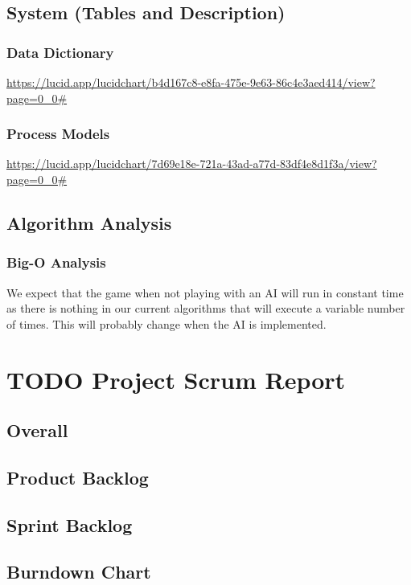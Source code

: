 \documentclass[11pt]{article}
\begin{document}
\subsection{System (Tables and Description)}
\label{sec:org2fe77dc}
\subsubsection{Data Dictionary}
\label{sec:org40756d9}
\url{https://lucid.app/lucidchart/b4d167c8-e8fa-475e-9e63-86c4e3aed414/view?page=0\_0\#}
\subsubsection{Process Models}
\label{sec:orgb34b0bc}
\url{https://lucid.app/lucidchart/7d69e18e-721a-43ad-a77d-83df4e8d1f3a/view?page=0\_0\#}
\subsection{Algorithm Analysis}
\label{sec:orgd92b26b}
\subsubsection{Big-O Analysis}
\label{sec:org3a21f5b}
We expect that the game when not playing with an AI will run in
constant time as there is nothing in our current algorithms that
will execute a variable number of times. This will probably change
when the AI is implemented.

\section{{\bfseries\sffamily TODO} Project Scrum Report}
\label{sec:org00fdbe5}
\subsection{Overall}
\label{sec:orgcf7572a}
\subsection{Product Backlog}
\label{sec:orgf3a07cc}
\subsection{Sprint Backlog}
\label{sec:orgbe429cd}
\subsection{Burndown Chart}
\label{sec:orga1ff6ca}
\end{document}
